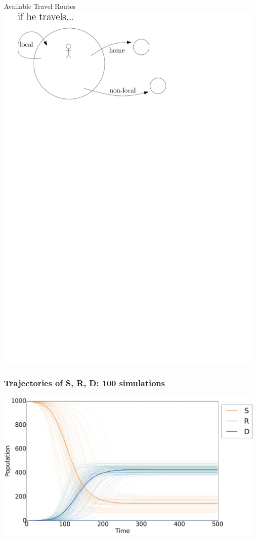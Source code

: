 \documentclass[30pt]{beamer}
\begin{document}
\begin{frame}{Available Travel Routes}
\includegraphics[width=\textwidth]{travel}
\end{frame}


\begin{frame}
\frametitle{Trajectories of S, R, D: 100 simulations}
\includegraphics[width=\textwidth]{average-time-series}
\end{frame}
\end{document}
